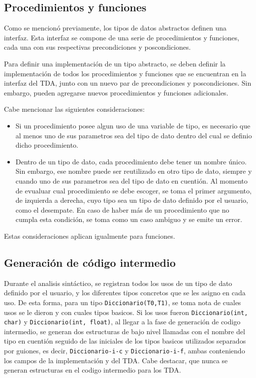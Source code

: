 
\subsection{Procedimientos y funciones}
Como se mencionó previamente, los tipos de datos abstractos definen una
interfaz. Esta interfaz se compone de una serie de procedimientos y funciones,
cada una con sus respectivas precondiciones y poscondiciones.

Para definir una implementación de un tipo abstracto, se deben definir la
implementación de todos los procedimientos y funciones que se encuentran en la
interfaz del TDA, junto con un nuevo par de precondiciones y poscondiciones.
Sin embargo, pueden agregarse nuevos procedimientos y funciones adicionales.

Cabe mencionar las siguientes consideraciones:

\begin{itemize}

  \item Si un procedimiento posee algun uso de una variable de tipo, es
  necesario que al menos uno de sus parametros sea del tipo de dato dentro del
  cual se definio dicho procedimiento.

  \item Dentro de un tipo de dato, cada procedimiento debe tener un nombre único.
  Sin embargo, ese nombre puede ser reutilizado en otro tipo de dato, siempre
  y cuando uno de sus parametros sea del tipo de dato en cuentión. Al momento
  de evualuar cual procedimiento se debe escoger, se toma el primer
  argumento, de izquierda a derecha, cuyo tipo sea un tipo de dato definido por
  el usuario, como el desempate. En caso de haber más de un procedimiento que
  no cumpla esta condición, se toma como un caso ambiguo y se emite un error.

\end{itemize}

Estas consideraciones aplican igualmente para funciones.


\subsection{Generación de código intermedio} Durante el analisis sintáctico, se
registran todos los usos de un tipo de dato definido por el usuario, y los
diferentes tipos concretos que se les asigno en cada uso. De esta forma, para un
tipo \texttt{Diccionario(T0,T1)}, se toma nota de cuales usos se le dieron y con
cuales tipos basicos. Si los usos fueron \texttt{Diccionario(int, char)} y
\texttt{Diccionario(int, float)}, al llegar a la fase de generación de codigo
intermedio, se generan dos estructuras de bajo nivel llamadas con el nombre del
tipo en cuentión seguido de las iniciales de los tipos basicos utilizados
separados por guiones, es decir, \texttt{Diccionario-i-c} y
\texttt{Diccionario-i-f}, ambas conteniendo los campos de la implementación y
del TDA. Cabe destacar, que nunca se generan estructuras en el codigo intermedio
para los TDA.


